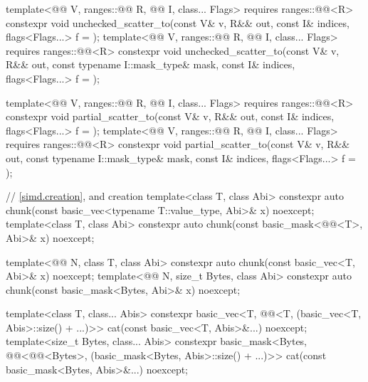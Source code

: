 \begin{codeblock}
{  template<@@ V, ranges::@@ R, @@ I, class... Flags>
    requires ranges::@@<R>
    constexpr void unchecked_scatter_to(const V& v, R&& out,
                                        const I& indices, flags<Flags...> f = {});
  template<@@ V, ranges::@@ R, @@ I, class... Flags>
    requires ranges::@@<R>
    constexpr void unchecked_scatter_to(const V& v, R&& out, const typename I::mask_type& mask,
                                        const I& indices, flags<Flags...> f = {});

  template<@@ V, ranges::@@ R, @@ I, class... Flags>
    requires ranges::@@<R>
    constexpr void partial_scatter_to(const V& v, R&& out,
                                      const I& indices, flags<Flags...> f = {});
  template<@@ V, ranges::@@ R, @@ I, class... Flags>
    requires ranges::@@<R>
    constexpr void partial_scatter_to(const V& v, R&& out, const typename I::mask_type& mask,
                                      const I& indices, flags<Flags...> f = {});

  // \ref{simd.creation},  and  creation
  template<class T, class Abi>
    constexpr auto chunk(const basic_vec<typename T::value_type, Abi>& x) noexcept;
  template<class T, class Abi>
    constexpr auto chunk(const basic_mask<@@<T>, Abi>& x) noexcept;

  template<@@ N, class T, class Abi>
    constexpr auto chunk(const basic_vec<T, Abi>& x) noexcept;
  template<@@ N, size_t Bytes, class Abi>
    constexpr auto chunk(const basic_mask<Bytes, Abi>& x) noexcept;

  template<class T, class... Abis>
    constexpr basic_vec<T, @@<T, (basic_vec<T, Abis>::size() + ...)>>
      cat(const basic_vec<T, Abis>&...) noexcept;
  template<size_t Bytes, class... Abis>
    constexpr basic_mask<Bytes, @@<@@<Bytes>,
                              (basic_mask<Bytes, Abis>::size() + ...)>>
      cat(const basic_mask<Bytes, Abis>&...) noexcept;

}
\end{codeblock}
